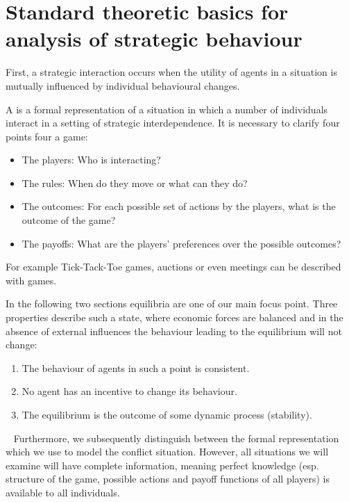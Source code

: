 

\chapter{Standard theoretic basics for analysis of strategic behaviour}

First, a strategic interaction occurs when the utility of agents in a situation is mutually influenced by individual behavioural changes. 

A  is a formal representation of a situation in which a number of individuals interact in a setting of strategic interdependence.
	It is necessary to clarify four points four a game:
	\begin{itemize}
		\item The players: Who is interacting?
		\item The rules: When do they move or what can they do?
		\item The outcomes: For each possible set of actions by the players, what is the outcome of the game?
		\item The payoffs: What are the players' preferences over the possible outcomes?
	\end{itemize}

For example Tick-Tack-Toe games, auctions or even meetings can be described with games. 

In the following two sections equilibria are one of our main focus point. Three properties describe such a state, where economic forces are balanced and in the absence of external influences the behaviour leading to the equilibrium will not change:
\begin{enumerate}
	\item The behaviour of agents in such a point is consistent.
	\item No agent has an incentive to change its behaviour.
	\item The equilibrium is the outcome of some dynamic process (stability).
\end{enumerate}

~\newline
Furthermore, we subsequently distinguish between the formal representation which we use to model the conflict situation. However, all situations we will examine will have complete information, meaning perfect knowledge (esp. structure of the game, possible actions and payoff functions of all players) is available to all individuals. 


\newpage
